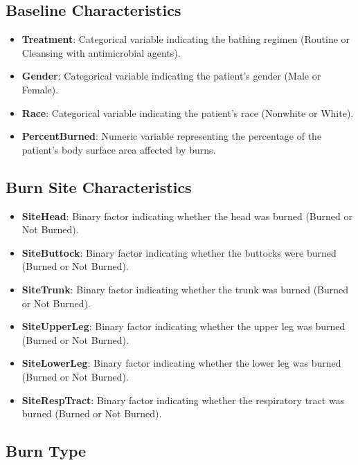 \documentclass[12pt]{article}
\providecommand{\tightlist}{%
  \setlength{\itemsep}{0pt}\setlength{\parskip}{0pt}}
\begin{document}
\subsection{\texorpdfstring{\textbf{Baseline
Characteristics}}{Baseline Characteristics}}\label{baseline-characteristics}

\begin{itemize}
\tightlist
\item
  \textbf{Treatment}: Categorical variable indicating the bathing
  regimen (Routine or Cleansing with antimicrobial agents).
\item
  \textbf{Gender}: Categorical variable indicating the patient's gender
  (Male or Female).
\item
  \textbf{Race}: Categorical variable indicating the patient's race
  (Nonwhite or White).
\item
  \textbf{PercentBurned}: Numeric variable representing the percentage
  of the patient's body surface area affected by burns.
\end{itemize}

\subsection{\texorpdfstring{\textbf{Burn Site
Characteristics}}{Burn Site Characteristics}}\label{burn-site-characteristics}

\begin{itemize}
\tightlist
\item
  \textbf{SiteHead}: Binary factor indicating whether the head was
  burned (Burned or Not Burned).
\item
  \textbf{SiteButtock}: Binary factor indicating whether the buttocks
  were burned (Burned or Not Burned).
\item
  \textbf{SiteTrunk}: Binary factor indicating whether the trunk was
  burned (Burned or Not Burned).
\item
  \textbf{SiteUpperLeg}: Binary factor indicating whether the upper leg
  was burned (Burned or Not Burned).
\item
  \textbf{SiteLowerLeg}: Binary factor indicating whether the lower leg
  was burned (Burned or Not Burned).
\item
  \textbf{SiteRespTract}: Binary factor indicating whether the
  respiratory tract was burned (Burned or Not Burned).
\end{itemize}

\subsection{\texorpdfstring{\textbf{Burn
Type}}{Burn Type}}\label{burn-type}
\end{document}
